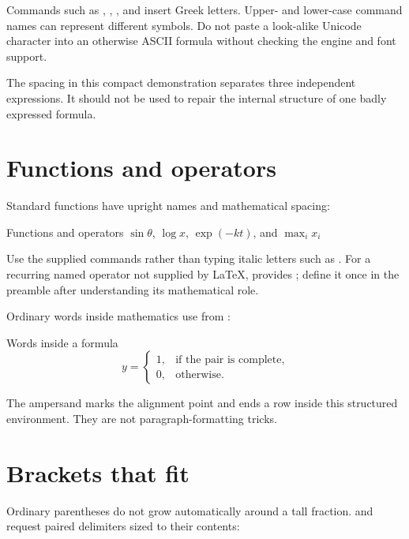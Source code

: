 Commands such as , , , and  insert
Greek letters. Upper- and lower-case command names can represent different
symbols. Do not paste a look-alike Unicode character into an otherwise ASCII
formula without checking the engine and font support.

The  spacing in this compact demonstration separates
three independent expressions. It should not be used to repair the internal
structure of one badly expressed formula.

\section{Functions and operators}

Standard functions have upright names and mathematical spacing:

\begin{latexcode}{Functions and operators}
$\sin \theta$, $\log x$, $\exp(-kt)$, and $\max_i x_i$
\end{latexcode}

Use the supplied commands rather than typing italic letters such as
. For a recurring named operator not supplied by \LaTeX{},
 provides ; define it once in the
preamble after understanding its mathematical role.

Ordinary words inside mathematics use  from :

\begin{latexcode}{Words inside a formula}
\[
  y = \begin{cases}
    1, & \text{if the pair is complete},\\
    0, & \text{otherwise}.
  \end{cases}
\]
\end{latexcode}

The ampersand marks the alignment point and \code{\\} ends a row inside this
structured environment. They are not paragraph-formatting tricks.

\section{Brackets that fit}

Ordinary parentheses do not grow automatically around a tall fraction.
 and  request paired delimiters sized to their contents:

